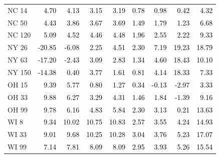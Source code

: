 \begin{tabular}{lrrrrrrrr}
NC 14 & \textcolor{black}{ 4.70 } & \textcolor{black}{ 4.13 } & \textcolor{black}{ 3.15 } & \textcolor{black}{ 3.19 } & \textcolor{black}{ 0.78 } & \textcolor{black}{ 0.98 } & \textcolor{black}{ 0.42 } & \textcolor{black}{ 4.32 } \\
NC 50 & \textcolor{black}{ 4.43 } & \textcolor{black}{ 3.86 } & \textcolor{black}{ 3.67 } & \textcolor{black}{ 3.69 } & \textcolor{black}{ 1.49 } & \textcolor{black}{ 1.79 } & \textcolor{black}{ 1.23 } & \textcolor{black}{ 6.68 } \\
NC 120 & \textcolor{black}{ 5.09 } & \textcolor{black}{ 4.52 } & \textcolor{black}{ 4.46 } & \textcolor{black}{ 4.48 } & \textcolor{black}{ 1.96 } & \textcolor{black}{ 2.55 } & \textcolor{black}{ 2.22 } & \textcolor{black}{ 9.33 } \\
NY 26 & \textcolor{black}{ -20.85 } & \textcolor{black}{ -6.08 } & \textcolor{black}{ 2.25 } & \textcolor{black}{ 4.51 } & \textcolor{black}{ 2.30 } & \textcolor{black}{ 7.19 } & \textcolor{black}{ 19.23 } & \textcolor{black}{ 18.79 } \\
NY 63 & \textcolor{black}{ -17.20 } & \textcolor{black}{ -2.43 } & \textcolor{black}{ 3.09 } & \textcolor{black}{ 2.83 } & \textcolor{black}{ 1.34 } & \textcolor{black}{ 4.60 } & \textcolor{black}{ 18.43 } & \textcolor{black}{ 10.10 } \\
NY 150 & \textcolor{black}{ -14.38 } & \textcolor{black}{ 0.40 } & \textcolor{black}{ 3.77 } & \textcolor{black}{ 1.61 } & \textcolor{black}{ 0.81 } & \textcolor{black}{ 4.14 } & \textcolor{black}{ 18.33 } & \textcolor{black}{ 7.33 } \\
OH 15 & \textcolor{black}{ 9.39 } & \textcolor{black}{ 5.77 } & \textcolor{black}{ 0.80 } & \textcolor{black}{ 1.27 } & \textcolor{black}{ 0.34 } & \textcolor{black}{ -0.13 } & \textcolor{black}{ -2.97 } & \textcolor{black}{ 3.33 } \\
OH 33 & \textcolor{black}{ 9.88 } & \textcolor{black}{ 6.27 } & \textcolor{black}{ 3.29 } & \textcolor{black}{ 4.31 } & \textcolor{black}{ 1.46 } & \textcolor{black}{ 1.84 } & \textcolor{black}{ -1.39 } & \textcolor{black}{ 9.16 } \\
OH 99 & \textcolor{black}{ 9.78 } & \textcolor{black}{ 6.16 } & \textcolor{black}{ 4.83 } & \textcolor{black}{ 5.84 } & \textcolor{black}{ 2.30 } & \textcolor{black}{ 3.13 } & \textcolor{black}{ 0.21 } & \textcolor{black}{ 13.63 } \\
WI 8 & \textcolor{black}{ 9.34 } & \textcolor{black}{ 10.02 } & \textcolor{black}{ 10.75 } & \textcolor{black}{ 10.83 } & \textcolor{black}{ 2.57 } & \textcolor{black}{ 3.55 } & \textcolor{black}{ 4.24 } & \textcolor{black}{ 14.93 } \\
WI 33 & \textcolor{black}{ 9.01 } & \textcolor{black}{ 9.68 } & \textcolor{black}{ 10.25 } & \textcolor{black}{ 10.28 } & \textcolor{black}{ 3.04 } & \textcolor{black}{ 3.76 } & \textcolor{black}{ 5.23 } & \textcolor{black}{ 17.07 } \\
WI 99 & \textcolor{black}{ 7.14 } & \textcolor{black}{ 7.81 } & \textcolor{black}{ 8.09 } & \textcolor{black}{ 8.09 } & \textcolor{black}{ 2.95 } & \textcolor{black}{ 3.93 } & \textcolor{black}{ 5.26 } & \textcolor{black}{ 15.54 } \\
\bottomrule
\end{tabular}
